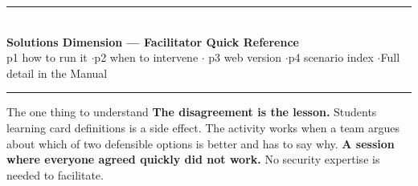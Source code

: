 \documentclass[9pt,letterpaper]{extarticle}
\begin{document}
{\color{deep}\rule{\textwidth}{1.5pt}}\\[0.3em]
{\LARGE\bfseries\color{deep} Solutions Dimension --- Facilitator Quick Reference}\\[0.2em]
{\small p1 how to run it \quad$\cdot$\quad p2 when to intervene \quad$\cdot$\quad
p3 web version \quad$\cdot$\quad p4 scenario index \quad$\cdot$\quad Full detail in the Manual}\\[0.2em]
{\color{deep}\rule{\textwidth}{1.5pt}}

\vspace{0.6em}
\begin{graybox}{The one thing to understand}
\textbf{The disagreement is the lesson.} Students learning card definitions is a
side effect. The activity works when a team argues about which of two defensible
options is better and has to say why. \textbf{A session where everyone agreed
quickly did not work.} No security expertise is needed to facilitate.
\end{graybox}
\end{document}
